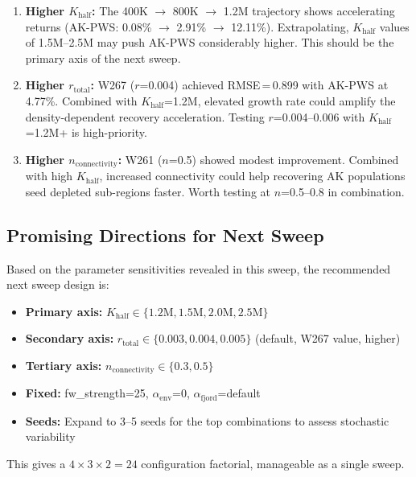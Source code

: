 \documentclass[11pt,a4paper]{article}
\begin{document}
\begin{enumerate}
    \item \textbf{Higher $K_{\text{half}}$:} The 400K $\to$ 800K $\to$ 1.2M trajectory shows accelerating returns (AK-PWS: 0.08\% $\to$ 2.91\% $\to$ 12.11\%). Extrapolating, $K_{\text{half}}$ values of 1.5M--2.5M may push AK-PWS considerably higher. This should be the primary axis of the next sweep.

    \item \textbf{Higher $r_{\text{total}}$:} W267 ($r$=0.004) achieved RMSE\,=\,0.899 with AK-PWS at 4.77\%. Combined with $K_{\text{half}}$=1.2M, elevated growth rate could amplify the density-dependent recovery acceleration. Testing $r$=0.004--0.006 with $K_{\text{half}}$=1.2M+ is high-priority.

    \item \textbf{Higher $n_{\text{connectivity}}$:} W261 ($n$=0.5) showed modest improvement. Combined with high $K_{\text{half}}$, increased connectivity could help recovering AK populations seed depleted sub-regions faster. Worth testing at $n$=0.5--0.8 in combination.
\end{enumerate}

\subsection{Promising Directions for Next Sweep}

Based on the parameter sensitivities revealed in this sweep, the recommended next sweep design is:

\begin{itemize}
    \item \textbf{Primary axis:} $K_{\text{half}} \in \{1.2\text{M}, 1.5\text{M}, 2.0\text{M}, 2.5\text{M}\}$
    \item \textbf{Secondary axis:} $r_{\text{total}} \in \{0.003, 0.004, 0.005\}$ (default, W267 value, higher)
    \item \textbf{Tertiary axis:} $n_{\text{connectivity}} \in \{0.3, 0.5\}$
    \item \textbf{Fixed:} fw\_strength=25, $\alpha_{\text{env}}$=0, $\alpha_{\text{fjord}}$=default
    \item \textbf{Seeds:} Expand to 3--5 seeds for the top combinations to assess stochastic variability
\end{itemize}

This gives a $4 \times 3 \times 2 = 24$ configuration factorial, manageable as a single sweep.
\end{document}
